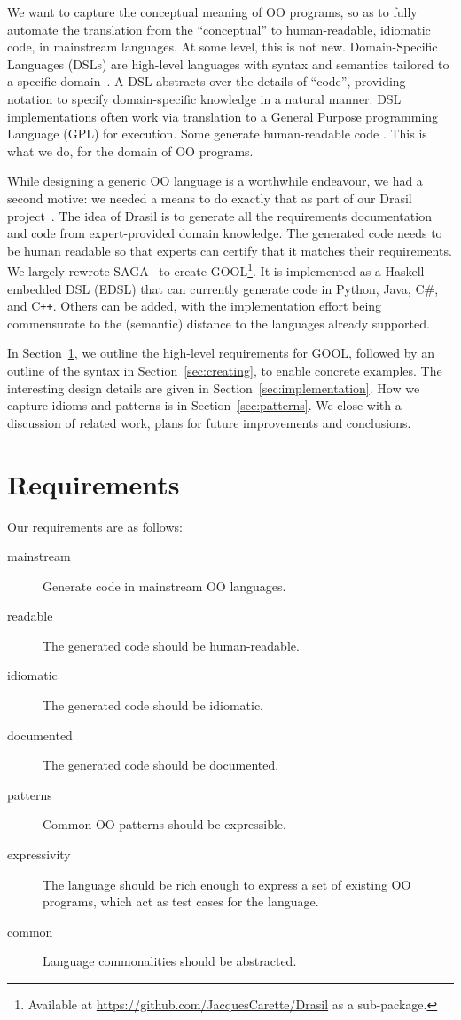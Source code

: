 \documentclass[sigplan,review,prologue,dvipsnames]{acmart}
\newcommand{\Csharp}{C\#}
\newcommand{\Cplusplus}{C\texttt{++}}
\begin{document}
We want to capture the conceptual meaning of
OO programs, so as to fully automate the translation from
the ``conceptual'' to human-readable, idiomatic code, in mainstream
languages.
At some level, this is not new.  Domain-Specific Languages (DSLs)
are high-level languages with syntax and semantics tailored to a specific
domain~\cite{mernik2005and}.  A DSL
abstracts over the details of ``code'', providing notation to
specify domain-specific knowledge in a natural manner. DSL implementations
often work via translation to a General Purpose programming Language (GPL) for 
execution.  Some generate
human-readable code \cite{wang1997zephyr, mooij2013gaining, hong2012green, 
beyak2011saga}.  This is what we do, for the domain of OO programs.

While designing a generic OO language is a worthwhile endeavour, we had
a second motive: we needed a means to do exactly that as part of
our Drasil project~\cite{Drasil2019, SzymczakEtAl2016}.  The idea of Drasil is
to generate all the requirements documentation and code from expert-provided
domain knowledge.  The generated code needs to be human readable so that
experts can certify that it matches their requirements.
We largely rewrote SAGA~\cite{beyak2011saga} to create
GOOL\footnote{Available at \url{https://github.com/JacquesCarette/Drasil}
as a sub-package.}.
It is implemented as a Haskell embedded DSL (EDSL) that
can currently generate code in Python, Java, \Csharp, and \Cplusplus.
Others can be added, with the implementation effort being commensurate to the
(semantic) distance to the languages already supported.

In Section~\ref{sec:req}, we outline the high-level requirements for GOOL,
followed by an outline of the syntax in Section~\ref{sec:creating}, to
enable concrete examples. The interesting design details are given in
Section~\ref{sec:implementation}. How we capture idioms and patterns is
in Section~\ref{sec:patterns}. We
close with a discussion of related work, plans for future improvements
and conclusions.

\section{Requirements} \label{sec:req}

Our requirements are as follows:

\begin{description}
\item[mainstream] Generate code in mainstream OO languages.
\item[readable] The generated code should be human-readable.
\item[idiomatic] The generated code should be idiomatic.
\item[documented] The generated code should be documented.
\item[patterns] Common OO patterns should be expressible.
\item[expressivity] The language should be rich enough to express a
set of existing OO programs, which act as test cases for the language.
\item[common] Language commonalities should be abstracted.
\end{description}
\end{document}
